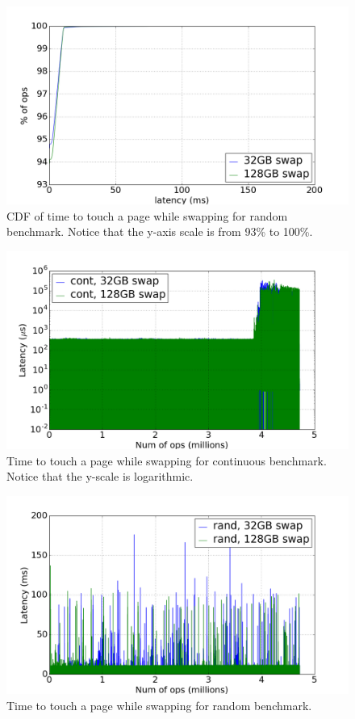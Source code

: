 \documentclass[twocolumn,11pt]{article}
\begin{document}
\begin{figure}
    \includegraphics[width=\columnwidth]{figures/swap_touch_time_rand_cdf}
    \caption{CDF of time to touch a page while swapping for random benchmark.
    Notice that the y-axis scale is from 93\% to 100\%.\label{fig:swap_time_rand_cdf}}
\end{figure}

\begin{figure}
    \includegraphics[width=\columnwidth]{figures/swap_time_cont}
    \caption{Time to touch a page while swapping for continuous benchmark.
    Notice that the y-scale is logarithmic.\label{fig:swap_time_cont}}
\end{figure}

\begin{figure}
    \includegraphics[width=\columnwidth]{figures/swap_time_rand}
    \caption{Time to touch a page while swapping for random
    benchmark.\label{fig:swap_time_rand}}
\end{figure}
\end{document}
